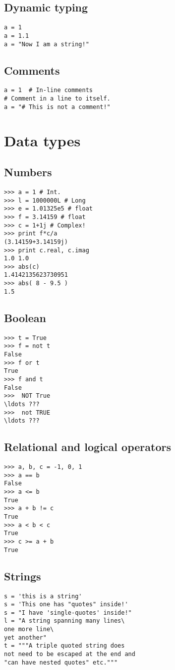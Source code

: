 \documentclass[12pt]{article}
\begin{document}
\subsection{Dynamic typing}
\begin{verbatim}
a = 1
a = 1.1
a = "Now I am a string!"
\end{verbatim}

\subsection{Comments}
\begin{verbatim}
a = 1  # In-line comments
# Comment in a line to itself.
a = "# This is not a comment!"
  \end{verbatim}

\section{Data types}
\subsection{Numbers}
  \begin{verbatim}
>>> a = 1 # Int.
>>> l = 1000000L # Long
>>> e = 1.01325e5 # float
>>> f = 3.14159 # float
>>> c = 1+1j # Complex!
>>> print f*c/a
(3.14159+3.14159j)
>>> print c.real, c.imag
1.0 1.0
>>> abs(c)
1.4142135623730951
>>> abs( 8 - 9.5 )
1.5
  \end{verbatim}

\subsection{Boolean}
  \begin{verbatim}
>>> t = True
>>> f = not t
False
>>> f or t
True
>>> f and t
False
>>>  NOT True
\ldots ???
>>>  not TRUE
\ldots ???
\end{verbatim}

\subsection{Relational and logical operators}
  \begin{verbatim}
>>> a, b, c = -1, 0, 1
>>> a == b
False
>>> a <= b 
True
>>> a + b != c
True
>>> a < b < c
True
>>> c >= a + b
True
  \end{verbatim}

\subsection{Strings}
  \begin{verbatim}
s = 'this is a string'
s = 'This one has "quotes" inside!'
s = "I have 'single-quotes' inside!"
l = "A string spanning many lines\
one more line\
yet another"
t = """A triple quoted string does
not need to be escaped at the end and 
"can have nested quotes" etc."""
  \end{verbatim}
\end{document}
